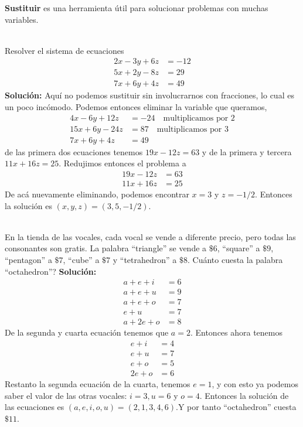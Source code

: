 \begin{tcolorbox}[colback=red!5!white,colframe=red!75!black]
	\textbf{Sustituir} es una herramienta útil para solucionar problemas con muchas variables.
\end{tcolorbox}

\begin{ejemplo}{\ \\}
	Resolver el sistema de ecuaciones
	\begin{align*}
	2x-3y+6z &= -12\\
	5x+2y-8z &= 29\\
	7x+6y+4z &= 49
	\end{align*}
	\textbf{Solución: } Aquí no podemos sustituir sin involucrarnos con fracciones, lo cual es un poco incómodo. Podemos entonces eliminar la variable que queramos,
	\begin{align*}
	4x-6y+12z &= -24 \quad \text{multiplicamos por 2}\\
	15x+6y-24z &= 87 \quad \text{multiplicamos por 3}\\
	7x+6y+4z &= 49
	\end{align*}
	de las primera dos ecuaciones tenemos $19x-12z=63$ y de la primera y tercera $11x +16z=25$. Redujimos entonces el problema a
	\begin{align*}
	19x-12z &= 63\\
	11x +16z &= 25
	\end{align*}
	De acá nuevamente eliminando, podemos encontrar $x=3$ y $z=-1/2$. Entonces la solución es $(x,y,z) = (3,5,-1/2)$.	
\end{ejemplo}

\begin{ejemplo}{\ \\}
	En la tienda de las vocales, cada vocal se vende a diferente precio, pero todas las consonantes son gratis. La palabra ``triangle'' se vende a $\$ 6$, ``square'' a $\$ 9$, ``pentagon'' a $\$ 7$, ``cube'' a $\$ 7$ y ``tetrahedron'' a $\$8$. Cuánto cuesta la palabra ``octahedron''?
	\textbf{Solución: } 
	\begin{align*}
	a+e+i &= 6\\
	a+e+u &= 9\\
	a+e+o &= 7\\
	e+u &= 7 \\
	a+2e+o &= 8
	\end{align*}
	De la segunda y cuarta ecuación tenemos que $a=2$. Entonces ahora tenemos
	\begin{align*}
	e+i &= 4\\
	e+u &= 7\\
	e+o &= 5\\
	2e+o &= 6
	\end{align*}
	Restanto la segunda ecuación de la cuarta, tenemos $e=1$, y con esto ya podemos saber el valor de las otras vocales: $i=3,u=6$ y $o=4$. Entonces la solución de las ecuaciones es $(a,e,i,o,u) = (2,1,3,4,6)$.Y por tanto ``octahedron'' cuesta $\$ 11$.
\end{ejemplo}

